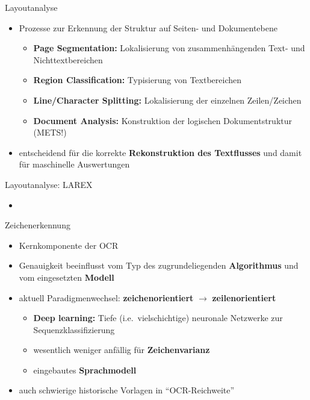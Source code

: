 \documentclass{bbawslides}
\begin{document}
\begin{bbawslide}{Layoutanalyse}
  \vspace*{7mm}%
  \centerslidestrue%
  \begin{itemize}
    \item Prozesse zur Erkennung der Struktur auf Seiten- und Dokumentebene
    \begin{itemize}\small
      \item \textbf{Page Segmentation:} Lokalisierung von zusammenhängenden Text- und Nichttextbereichen
      \item \textbf{Region Classification:} Typisierung von Textbereichen
      \item \textbf{Line/Character Splitting:} Lokalisierung der einzelnen Zeilen/Zeichen
      \item \textbf{Document Analysis:} Konstruktion der logischen Dokumentstruktur (METS!)
    \end{itemize}
    \item entscheidend für die korrekte \textbf{Rekonstruktion des Textflusses} und damit für maschinelle Auswertungen
  \end{itemize}
\end{bbawslide}

\begin{bbawslide}{Layoutanalyse: LAREX}
  \vspace*{7mm}%
  \centerslidestrue%
  \begin{itemize}
    \item
  \end{itemize}
\end{bbawslide}

\begin{bbawslide}{Zeichenerkennung}
  \vspace*{7mm}%
  \centerslidestrue%
  \begin{itemize}
    \item Kernkomponente der OCR
    \item Genauigkeit beeinflusst vom Typ des zugrundeliegenden \textbf{Algorithmus} und vom eingesetzten \textbf{Modell}
    \item aktuell Paradigmenwechsel: \textbf{zeichenorientiert} $\rightarrow$ \textbf{zeilenorientiert}
    \begin{itemize} \small
      \item \textbf{Deep learning:} Tiefe (i.e.~vielschichtige) neuronale Netzwerke zur Sequenzklassifizierung 
      \item wesentlich weniger anfällig für \textbf{Zeichenvarianz}
      \item eingebautes \textbf{Sprachmodell}
    \end{itemize}
    \item auch schwierige historische Vorlagen in \enquote{OCR-Reichweite} 
  \end{itemize}
\end{bbawslide}
\end{document}
